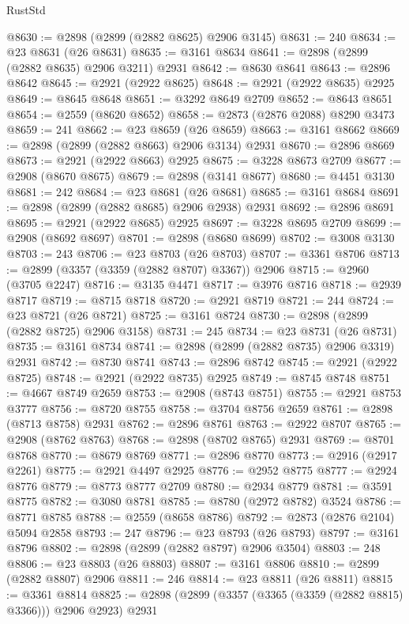 \begin{lexlean}{RustStd}
\begin{coremodule}
@8630 := @2898 (@2899 (@2882 @8625) @2906 @3145)
@8631 := 240
@8634 := @23 @8631 (@26 @8631)
@8635 := @3161 @8634
@8641 := @2898 (@2899 (@2882 @8635) @2906 @3211) @2931
@8642 := @8630 @8641
@8643 := @2896 @8642
@8645 := @2921 (@2922 @8625)
@8648 := @2921 (@2922 @8635) @2925
@8649 := @8645 @8648
@8651 := @3292 @8649 @2709
@8652 := @8643 @8651
@8654 := @2559 (@8620 @8652)
@8658 := @2873 (@2876 @2088) @8290 @3473
@8659 := 241
@8662 := @23 @8659 (@26 @8659)
@8663 := @3161 @8662
@8669 := @2898 (@2899 (@2882 @8663) @2906 @3134) @2931
@8670 := @2896 @8669
@8673 := @2921 (@2922 @8663) @2925
@8675 := @3228 @8673 @2709
@8677 := @2908 (@8670 @8675)
@8679 := @2898 (@3141 @8677)
@8680 := @4451 @3130
@8681 := 242
@8684 := @23 @8681 (@26 @8681)
@8685 := @3161 @8684
@8691 := @2898 (@2899 (@2882 @8685) @2906 @2938) @2931
@8692 := @2896 @8691
@8695 := @2921 (@2922 @8685) @2925
@8697 := @3228 @8695 @2709
@8699 := @2908 (@8692 @8697)
@8701 := @2898 (@8680 @8699)
@8702 := @3008 @3130
@8703 := 243
@8706 := @23 @8703 (@26 @8703)
@8707 := @3361 @8706
@8713 := @2899 (@3357 (@3359 (@2882 @8707) @3367)) @2906
@8715 := @2960 (@3705 @2247)
@8716 := @3135 @4471
@8717 := @3976 @8716
@8718 := @2939 @8717
@8719 := @8715 @8718
@8720 := @2921 @8719
@8721 := 244
@8724 := @23 @8721 (@26 @8721)
@8725 := @3161 @8724
@8730 := @2898 (@2899 (@2882 @8725) @2906 @3158)
@8731 := 245
@8734 := @23 @8731 (@26 @8731)
@8735 := @3161 @8734
@8741 := @2898 (@2899 (@2882 @8735) @2906 @3319) @2931
@8742 := @8730 @8741
@8743 := @2896 @8742
@8745 := @2921 (@2922 @8725)
@8748 := @2921 (@2922 @8735) @2925
@8749 := @8745 @8748
@8751 := @4667 @8749 @2659
@8753 := @2908 (@8743 @8751)
@8755 := @2921 @8753 @3777
@8756 := @8720 @8755
@8758 := @3704 @8756 @2659
@8761 := @2898 (@8713 @8758) @2931
@8762 := @2896 @8761
@8763 := @2922 @8707
@8765 := @2908 (@8762 @8763)
@8768 := @2898 (@8702 @8765) @2931
@8769 := @8701 @8768
@8770 := @8679 @8769
@8771 := @2896 @8770
@8773 := @2916 (@2917 @2261)
@8775 := @2921 @4497 @2925
@8776 := @2952 @8775
@8777 := @2924 @8776
@8779 := @8773 @8777 @2709
@8780 := @2934 @8779
@8781 := @3591 @8775
@8782 := @3080 @8781
@8785 := @8780 (@2972 @8782) @3524
@8786 := @8771 @8785
@8788 := @2559 (@8658 @8786)
@8792 := @2873 (@2876 @2104) @5094 @2858
@8793 := 247
@8796 := @23 @8793 (@26 @8793)
@8797 := @3161 @8796
@8802 := @2898 (@2899 (@2882 @8797) @2906 @3504)
@8803 := 248
@8806 := @23 @8803 (@26 @8803)
@8807 := @3161 @8806
@8810 := @2899 (@2882 @8807) @2906
@8811 := 246
@8814 := @23 @8811 (@26 @8811)
@8815 := @3361 @8814
@8825 := @2898 (@2899 (@3357 (@3365 (@3359 (@2882 @8815) @3366))) @2906 @2923) @2931

\end{coremodule}
\end{lexlean}

